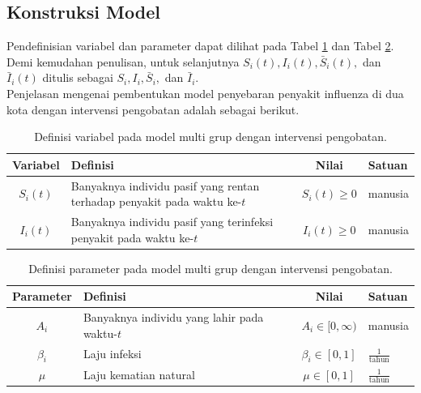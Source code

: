 \subsection{Konstruksi Model}
Pendefinisian variabel dan parameter dapat dilihat pada Tabel \ref{table:31} dan Tabel \ref{table:32}. Demi kemudahan penulisan, untuk selanjutnya $S_i(t),I_i(t),\bar{S}_i(t),$ dan $\bar{I}_i(t)$ ditulis sebagai $S_i,I_i,\bar{S}_i,$ dan $\bar{I}_i$.\\
Penjelasan mengenai pembentukan model penyebaran penyakit influenza di dua kota dengan intervensi pengobatan adalah sebagai berikut.
\begin{table}
	\caption{Definisi variabel pada model multi grup dengan intervensi pengobatan.}
	\begin{tabular}{|c|p{6cm}|c|p{2cm}|}
		\hline
		\textbf{Variabel}& \textbf{Definisi}& \textbf{Nilai}& \textbf{Satuan}\\
		\hline
		\hline
		$S_i(t)$& Banyaknya individu pasif yang rentan terhadap penyakit pada waktu ke-$t$& $S_i(t)\geqslant 0$& manusia\\
		\hline
		$I_i(t)$& Banyaknya individu pasif yang terinfeksi penyakit pada waktu ke-$t$& $I_i(t)\geqslant 0$& manusia\\
		\hline
	\end{tabular}
	\label{table:31}
\end{table}

\begin{table}[htb]
	\caption{Definisi parameter pada model multi grup dengan intervensi pengobatan.}
	\centering
	\begin{tabular}{|c|p{6cm}|c|p{2cm}|}
		\hline
		\textbf{Parameter}& \textbf{Definisi}& \textbf{Nilai}& \textbf{Satuan}\\
		\hline
		\hline
		$A_i$ & Banyaknya individu yang lahir pada waktu-$t$ & $A_i\in [0,\infty)$ & manusia \\
		\hline
		$\beta_i$ & Laju infeksi & $\beta_i\in [0,1]$ & $\frac{1}{\text{tahun}}$ \\
		\hline
		$\mu$ & Laju kematian natural& $\mu\in [0,1]$ & $\frac{1}{\text{tahun}}$ \\
		\hline
	\end{tabular}
\label{table:32}
\end{table}

